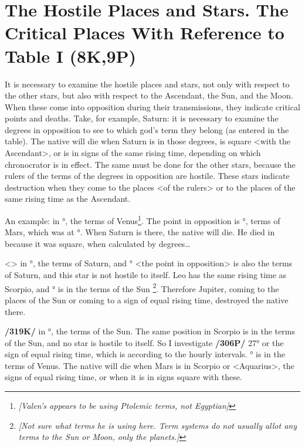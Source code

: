 \section{The Hostile Places and Stars. The Critical Places With Reference to Table I (8K,9P)}

It is necessary to examine the hostile places and stars, not only with respect to the other stars, but also with respect to the Ascendant, the Sun, and the Moon. When these come into opposition during their
transmissions, they indicate critical points and deaths. Take, for example, Saturn: it is necessary to examine the degrees in opposition to see to which god’s term they belong (as entered in the table). The
native will die when Saturn is in those degrees, is square <with the Ascendant>, or is in signs of the same rising time, depending on which chronocrator is in effect. The same must be done for the other stars, because the rulers of the terms of the degrees in opposition are hostile. These stars indicate destruction when they come to the places <of the rulers> or to the places of the same rising time as the Ascendant.

An example: \Saturn\xspace in \Cancer\xspace 21°, the terms of Venus\footnote{\textit{[Valen's appears to be using Ptolemic terms, not Egyptian]}}. The point in opposition is \Capricorn\xspace 21°, terms of Mars, which was at \Taurus\xspace 27°. When Saturn is there, the native will die. He died in \Virgo because it was square, when calculated by degrees…

<\Jupiter> in \Scorpio\xspace 14°, the terms of Saturn, and \Taurus\xspace 14° <the point in opposition> is also the terms of Saturn, and this star is not hostile to itself. Leo has the same rising time as Scorpio, and \Leo\xspace 14° is in the terms of the Sun \footnote{\textit{[Not sure what terms he is using here. Term systems do not usually allot any terms to the Sun or Moon, only the planets.]}}. Therefore Jupiter, coming to the places of the Sun or coming to a sign of equal rising time, destroyed the native there.

\textbf{/319K/} \Mars\xspace in \Taurus\xspace 27°, the terms of the Sun. The same position in Scorpio is in the terms of the
Sun, and \mndl no star is hostile to itself. So I investigate \Leo\xspace \textbf{/306P/} 27° or the sign of equal rising time, which is \Gemini\xspace according to the hourly intervals. \Gemini\xspace 27° is in the terms of Venus. The native will die when Mars is in Scorpio or <Aquarius>, the signs of equal rising time, or when it is in signs square with these. 

